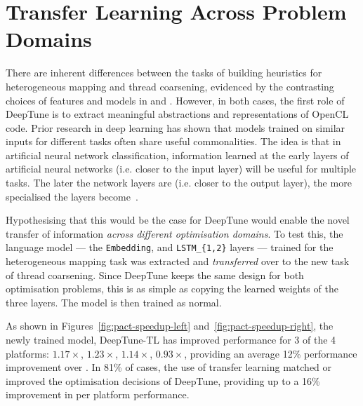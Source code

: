 \section{Transfer Learning Across Problem Domains}
\label{sec:deeptune-transfer-learning}

There are inherent differences between the tasks of building heuristics for heterogeneous mapping and thread coarsening, evidenced by the contrasting choices of features and models in \citeauthor{Grewe2013} and \citeauthor{Magni2014}. However, in both cases, the first role of DeepTune is to extract meaningful abstractions and representations of OpenCL code. Prior research in deep learning has shown that models trained on similar inputs for different tasks often share useful commonalities. The idea is that in artificial neural network classification, information learned at the early layers of artificial neural networks (i.e. closer to the input layer) will be useful for multiple tasks. The later the network layers are (i.e. closer to the output layer), the more specialised the layers become~\cite{Zeiler2014}.

Hypothesising that this would be the case for DeepTune would enable the novel transfer of information \emph{across different optimisation domains}. To test this, the language model --- the \texttt{Embedding}, and \texttt{LSTM\_\{1,2\}} layers --- trained for the heterogeneous mapping task was extracted and \emph{transferred} over to the new task of thread coarsening. Since DeepTune keeps the same design for both optimisation problems, this is as simple as copying the learned weights of the three layers. The model is then trained as normal.

As shown in Figures~\ref{fig:pact-speedup-left} and~\ref{fig:pact-speedup-right}, the newly trained model, DeepTune-TL has improved performance for 3 of the 4 platforms: $1.17\times$, $1.23\times$, $1.14\times$, $0.93\times$, providing an average 12\% performance improvement over \citeauthor{Magni2014}. In 81\% of cases, the use of transfer learning matched or improved the optimisation decisions of DeepTune, providing up to a 16\% improvement in per platform performance.

